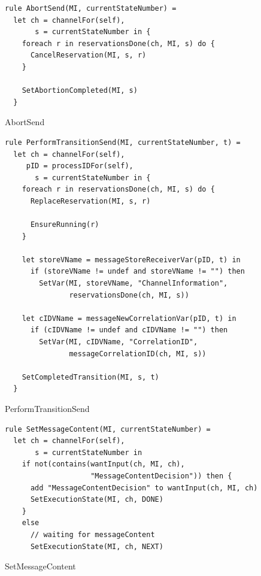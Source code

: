 \begin{listing}[H]
\begin{verbatim}
rule AbortSend(MI, currentStateNumber) =
  let ch = channelFor(self),
       s = currentStateNumber in {
    foreach r in reservationsDone(ch, MI, s) do {
      CancelReservation(MI, s, r)
    }

    SetAbortionCompleted(MI, s)
  }
\end{verbatim}
\caption{AbortSend}
\label{lst:asm:AbortSend}
\end{listing}




\begin{listing}[H]
\begin{verbatim}
rule PerformTransitionSend(MI, currentStateNumber, t) =
  let ch = channelFor(self),
     pID = processIDFor(self),
       s = currentStateNumber in {
    foreach r in reservationsDone(ch, MI, s) do {
      ReplaceReservation(MI, s, r)

      EnsureRunning(r)
    }

    let storeVName = messageStoreReceiverVar(pID, t) in
      if (storeVName != undef and storeVName != "") then
        SetVar(MI, storeVName, "ChannelInformation",
               reservationsDone(ch, MI, s))

    let cIDVName = messageNewCorrelationVar(pID, t) in
      if (cIDVName != undef and cIDVName != "") then
        SetVar(MI, cIDVName, "CorrelationID",
               messageCorrelationID(ch, MI, s))

    SetCompletedTransition(MI, s, t)
  }
\end{verbatim}
\caption{PerformTransitionSend}
\label{lst:asm:PerformTransitionSend}
\end{listing}




\begin{listing}[H]
\begin{verbatim}
rule SetMessageContent(MI, currentStateNumber) =
  let ch = channelFor(self),
       s = currentStateNumber in
    if not(contains(wantInput(ch, MI, ch),
                    "MessageContentDecision")) then {
      add "MessageContentDecision" to wantInput(ch, MI, ch)
      SetExecutionState(MI, ch, DONE)
    }
    else
      // waiting for messageContent
      SetExecutionState(MI, ch, NEXT)
\end{verbatim}
\caption{SetMessageContent}
\label{lst:asm:SetMessageContent}
\end{listing}




